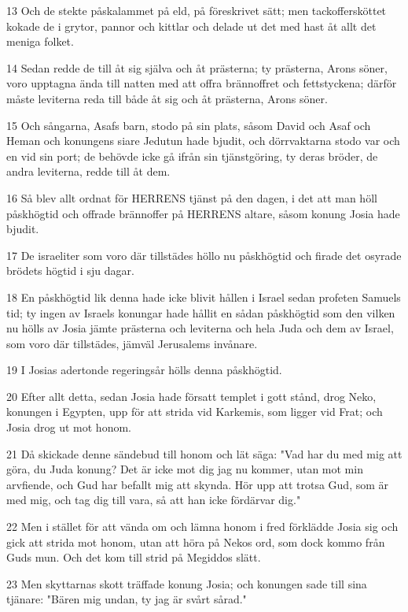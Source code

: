 \par 13 Och de stekte påskalammet på eld, på föreskrivet sätt; men tackoffersköttet kokade de i grytor, pannor och kittlar och delade ut det med hast åt allt det meniga folket.
\par 14 Sedan redde de till åt sig själva och åt prästerna; ty prästerna, Arons söner, voro upptagna ända till natten med att offra brännoffret och fettstyckena; därför måste leviterna reda till både åt sig och åt prästerna, Arons söner.
\par 15 Och sångarna, Asafs barn, stodo på sin plats, såsom David och Asaf och Heman och konungens siare Jedutun hade bjudit, och dörrvaktarna stodo var och en vid sin port; de behövde icke gå ifrån sin tjänstgöring, ty deras bröder, de andra leviterna, redde till åt dem.
\par 16 Så blev allt ordnat för HERRENS tjänst på den dagen, i det att man höll påskhögtid och offrade brännoffer på HERRENS altare, såsom konung Josia hade bjudit.
\par 17 De israeliter som voro där tillstädes höllo nu påskhögtid och firade det osyrade brödets högtid i sju dagar.
\par 18 En påskhögtid lik denna hade icke blivit hållen i Israel sedan profeten Samuels tid; ty ingen av Israels konungar hade hållit en sådan påskhögtid som den vilken nu hölls av Josia jämte prästerna och leviterna och hela Juda och dem av Israel, som voro där tillstädes, jämväl Jerusalems invånare.
\par 19 I Josias adertonde regeringsår hölls denna påskhögtid.
\par 20 Efter allt detta, sedan Josia hade försatt templet i gott stånd, drog Neko, konungen i Egypten, upp för att strida vid Karkemis, som ligger vid Frat; och Josia drog ut mot honom.
\par 21 Då skickade denne sändebud till honom och lät säga: "Vad har du med mig att göra, du Juda konung? Det är icke mot dig jag nu kommer, utan mot min arvfiende, och Gud har befallt mig att skynda. Hör upp att trotsa Gud, som är med mig, och tag dig till vara, så att han icke fördärvar dig."
\par 22 Men i stället för att vända om och lämna honom i fred förklädde Josia sig och gick att strida mot honom, utan att höra på Nekos ord, som dock kommo från Guds mun. Och det kom till strid på Megiddos slätt.
\par 23 Men skyttarnas skott träffade konung Josia; och konungen sade till sina tjänare: "Bären mig undan, ty jag är svårt sårad."
